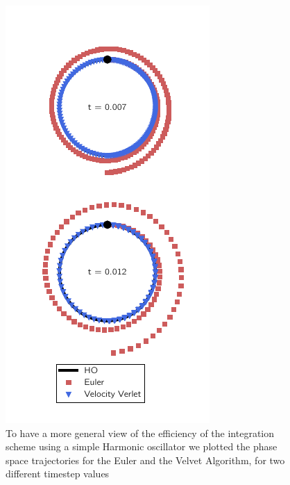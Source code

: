 \documentclass[ansiapaper]{report}
\begin{document}
\begin{multicols}{3}
\begin{figure}[H]
		\includegraphics[width=1\linewidth]{./figures/HarmonicOscillator.pdf}
		\caption{\label{fig:Velevet_euler} To have a more general view of the efficiency of the integration scheme using a simple Harmonic oscillator we plotted the phase space trajectories for the Euler and the Velvet Algorithm, for two different timestep values}
	\end{figure}


\end{multicols}
\end{document}
